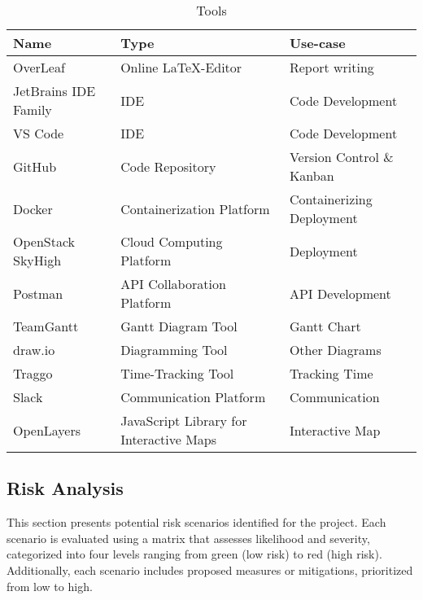 \begin{table} [H]
    \centering
    \begin{tabular}{|l|l|l|}
    \hline
    \textbf{Name} & \textbf{Type} & \textbf{Use-case} \\
    \hline
    OverLeaf & Online \LaTeX-Editor & Report writing \\
    JetBrains IDE Family & IDE & Code Development \\
    VS Code & IDE & Code Development \\
    GitHub \cite{github_org} & Code Repository & Version Control \& Kanban \\
    Docker & Containerization Platform & Containerizing Deployment \\
    OpenStack SkyHigh & Cloud Computing Platform & Deployment \\
    Postman & API Collaboration Platform & API Development \\
    TeamGantt & Gantt Diagram Tool & Gantt Chart \\
    draw.io & Diagramming Tool & Other Diagrams \\
    Traggo & Time-Tracking Tool & Tracking Time \\
    Slack & Communication Platform & Communication \\
    OpenLayers & JavaScript Library for Interactive Maps & Interactive Map  \\
    \hline
    \end{tabular}
    \caption{Tools}
    \label{tab:tools}
\end{table}

\subsection{Risk Analysis}\label{sec:risk_analysis}

This section presents potential risk scenarios identified for the project. Each scenario is evaluated using a matrix that assesses likelihood and severity, categorized into four levels ranging from green (low risk) to red (high risk). Additionally, each scenario includes proposed measures or mitigations, prioritized from low to high.

